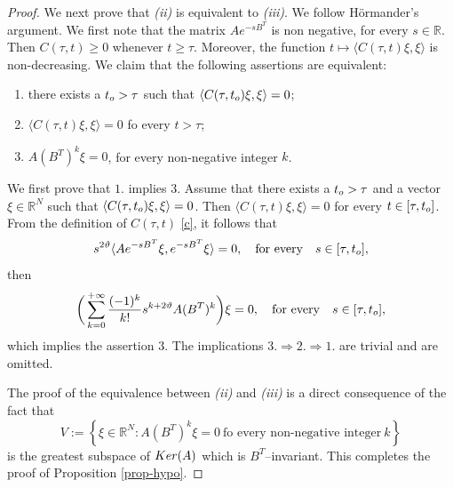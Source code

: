\documentclass{amsart}
\numberwithin{equation}{section}
\def \R {{\mathbb {R}}}
\begin{document}
{\begin{proof}
We next prove that {\it (ii)} is equivalent to {\it (iii)}. We follow H\"ormander's argument. We first note that the matrix $A e^{-sB^T}$ is non negative, for every $s \in \R$. Then $C(\tau,t) \ge 0$ whenever $t \ge \tau$. Moreover, the function $t \mapsto \langle C(\tau,t) \xi, \xi \rangle$ is non-decreasing. We claim that the following assertions are equivalent:
\begin{enumerate}
 \item there exists a $t_{\rm o} > \tau$ such that $\langle C(\tau,t_{\rm o}) \xi, \xi \rangle = 0$;
 \item $\langle C(\tau,t) \xi, \xi \rangle = 0$ fo every $t > \tau$;
 \item $A (B^T)^k \xi = 0$, for every non-negative integer $k$.
\end{enumerate}
We first prove that $1.$ implies $3.$ Assume that there exists a $t_{\rm o} > \tau$ and a vector $\xi \in \R^N$ such that $\langle C(\tau,t_{\rm o}) \xi, \xi \rangle = 0$. Then $\langle C(\tau,t) \xi, \xi \rangle = 0$ for every $t \in [\tau, t_{\rm o}]$. From the definition of $C(\tau,t)$ \eqref{c}, it follows that
\begin{equation*}
 s^{2\vartheta} \langle A e^{-sB^T} \xi, e^{-sB^T} \xi \rangle=0, \quad \text{for every} \quad s \in [\tau, t_{\rm o}],
\end{equation*}
then 
\begin{equation*}
 \bigg(\sum_{k=0}^{+ \infty} \frac{(-1)^k}{k!}s^{k + 2\vartheta}  A (B^T)^k \bigg) \xi = 0, \quad \text{for every} \quad s \in [\tau, t_{\rm o}],
\end{equation*}
which implies the assertion $3.$ The implications $3. \Rightarrow 2. \Rightarrow 1.$ are trivial and are omitted.  

The proof of the equivalence between {\it (ii)} and {\it (iii)} is a direct consequence of the fact that
\[
 V := \left\{ \xi \in \R^N : A (B^T)^k \xi = 0 \ \text{fo every non-negative integer} \ k \right\}
\]
is the greatest subspace of ${\rm Ker} (A)$ which is $B^T$--invariant. 
This completes the proof of Proposition \ref{prop-hypo}. 
\end{proof}

}
\end{document}
